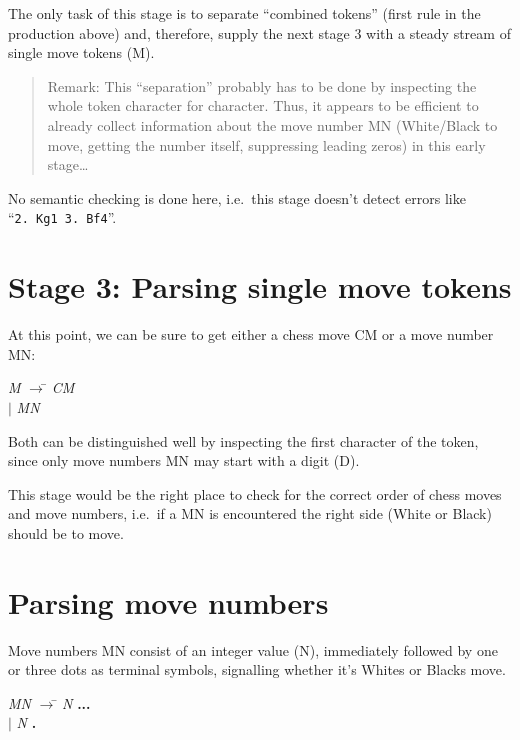 \documentclass[a4paper]{article}
\def\abbrev#1{\textsf{#1}}
\def\bnf#1{\textit{#1}}
\def\bnfterm#1{\textbf{#1}}
\def\bnfprod{$\rightarrow$}
\def\bnfor{$|$}
\begin{document}
The only task of this stage is to separate ``combined tokens'' (first rule in the
production above) and, therefore, supply the next stage 3 with a steady stream
of single move tokens (\abbrev{M}). 

\begin{quote}
Remark: This ``separation'' probably has to be done by inspecting the whole
token character for character. Thus, it appears to be efficient to already
collect information about the move number \abbrev{MN} (White/Black to move,
getting the number itself, suppressing leading zeros) in this early stage\ldots
\end{quote}

No semantic checking is done here, i.e.~this stage doesn't
detect errors like \mbox{``\texttt{2.~Kg1 3.~Bf4}''}.

\section*{Stage 3: Parsing single move tokens}

At this point, we can be sure to get either a chess move \abbrev{CM}
or a move number \abbrev{MN}:

\begin{center}
\begin{minipage}{3cm}
\begin{tabbing}
\bnf{M} \bnfprod\={} \bnf{CM}\\
 \>\bnfor{} \bnf{MN}
\end{tabbing}
\end{minipage}
\end{center}

Both can be distinguished well by inspecting the first character of the token, since
only move numbers \abbrev{MN} may start with a digit (\abbrev{D}).

This stage would be the right place to check for the correct order
of chess moves and move numbers, i.e.~if a \abbrev{MN} is encountered
the right side (White or Black) should be to move.

\section*{Parsing move numbers}

Move numbers \abbrev{MN} consist of an integer value (\abbrev{N}), immediately
followed by one or three dots as terminal symbols, signalling whether it's
Whites or Blacks move.

\begin{center}
\begin{minipage}{3cm}
\begin{tabbing}
\bnf{MN} \bnfprod\={} \bnf{N} \bnfterm{...}\\
 \>\bnfor{} \bnf{N} \bnfterm{.}
\end{tabbing}
\end{minipage}
\end{center}
\end{document}
